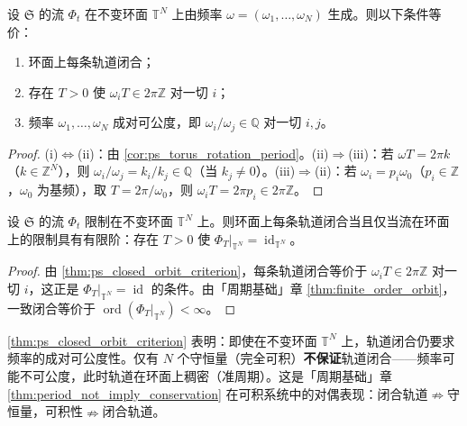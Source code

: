 \begin{theorem}[闭合轨道的充分判据]\label{thm:ps_closed_orbit_criterion}
设 $\mathfrak{S}$ 的流 $\Phi_t$ 在不变环面 $\mathbb{T}^N$ 上由频率 $\omega=(\omega_1,\dots,\omega_N)$ 生成。则以下条件等价：
\begin{enumerate}[label=(\roman*)]
    \item 环面上每条轨道闭合；
    \item 存在 $T>0$ 使 $\omega_i T\in 2\pi\mathbb{Z}$ 对一切 $i$；
    \item 频率 $\omega_1,\dots,\omega_N$ 成对可公度，即 $\omega_i/\omega_j\in\mathbb{Q}$ 对一切 $i,j$。
\end{enumerate}
\end{theorem}

\begin{proof}
(i)$\Leftrightarrow$(ii)：由 \cref{cor:ps_torus_rotation_period}。(ii)$\Rightarrow$(iii)：若 $\omega T = 2\pi k$（$k\in\mathbb{Z}^N$），则 $\omega_i/\omega_j = k_i/k_j\in\mathbb{Q}$（当 $k_j\neq 0$）。(iii)$\Rightarrow$(ii)：若 $\omega_i = p_i\omega_0$（$p_i\in\mathbb{Z}$，$\omega_0$ 为基频），取 $T = 2\pi/\omega_0$，则 $\omega_i T = 2\pi p_i\in 2\pi\mathbb{Z}$。
\end{proof}

\begin{corollary}[闭合轨道与有限阶作用的等价性]\label{cor:ps_closed_orbit_finite_order}
设 $\mathfrak{S}$ 的流 $\Phi_t$ 限制在不变环面 $\mathbb{T}^N$ 上。则环面上每条轨道闭合当且仅当流在环面上的限制具有有限阶：存在 $T>0$ 使 $\Phi_T|_{\mathbb{T}^N} = \operatorname{id}_{\mathbb{T}^N}$。
\end{corollary}

\begin{proof}
由 \cref{thm:ps_closed_orbit_criterion}，每条轨道闭合等价于 $\omega_i T\in 2\pi\mathbb{Z}$ 对一切 $i$，这正是 $\Phi_T|_{\mathbb{T}^N} = \operatorname{id}$ 的条件。由「周期基础」章 \cref{thm:finite_order_orbit}，一致闭合等价于 $\operatorname{ord}(\Phi_T|_{\mathbb{T}^N})<\infty$。
\end{proof}

\begin{remark}[守恒量不保证闭合]\label{rem:ps_conservation_not_sufficient}
\cref{thm:ps_closed_orbit_criterion} 表明：即使在不变环面 $\mathbb{T}^N$ 上，轨道闭合仍要求频率的成对可公度性。仅有 $N$ 个守恒量（完全可积）\textbf{不保证}轨道闭合——频率可能不可公度，此时轨道在环面上稠密（准周期）。这是「周期基础」章 \cref{thm:period_not_imply_conservation} 在可积系统中的对偶表现：闭合轨道$\nRightarrow$守恒量，可积性$\nRightarrow$闭合轨道。
\end{remark}

